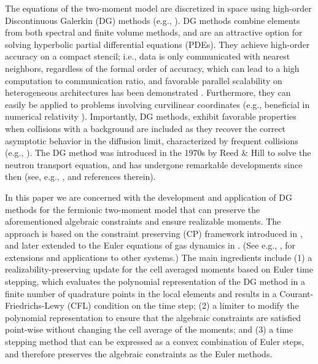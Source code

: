 The equations of the two-moment model are discretized in space using high-order Discontinuous Galerkin (DG) methods (e.g., \cite{cockburnShu_2001,hesthavenWarburton_2008}).  
DG methods combine elements from both spectral and finite volume methods, and are an attractive option for solving hyperbolic partial differential equations (PDEs).  
They achieve high-order accuracy on a compact stencil; i.e., data is only communicated with nearest neighbors, regardless of the formal order of accuracy, which can lead to a high computation to communication ratio, and favorable parallel scalability on heterogeneous architectures has been demonstrated \cite{klockner_etal_2009}.  
Furthermore, they can easily be applied to problems involving curvilinear coordinates (e.g., beneficial in numerical relativity \cite{teukolsky_2016}).  
Importantly, DG methods, exhibit favorable properties when collisions with a background are included as they recover the correct asymptotic behavior in the diffusion limit, characterized by frequent collisions (e.g., \cite{larsenMorel_1989,adams_2001,guermondKanschat_2010}).  
The DG method was introduced in the 1970s by Reed \& Hill \cite{reedHill_1973} to solve the neutron transport equation, and has undergone remarkable developments since then (see, e.g., \cite{shu_2016}, and references therein).  

In this paper we are concerned with the development and application of DG methods for the fermionic two-moment model that can preserve the aforementioned algebraic constraints and ensure realizable moments.  
The approach is based on the constraint preserving (CP) framework introduced in \cite{zhangShu_2010a}, and later extended to the Euler equations of gas dynamics in \cite{zhangShu_2010b}.  
(See e.g., \cite{endeve_etal_2015}, for extensions and applications to other systems.)  
The main ingredients include (1) a realizability-preserving update for the cell averaged moments based on Euler time stepping, which evaluates the polynomial representation of the DG method in a finite number of quadrature points in the local elements and results in a Courant-Friedrichs-Lewy (CFL) condition on the time step; (2) a limiter to modify the polynomial representation to ensure that the algebraic constraints are satisfied point-wise without changing the cell average of the moments; and (3) a time stepping method that can be expressed as a convex combination of Euler steps, and therefore preserves the algebraic constraints as the Euler methods.  

